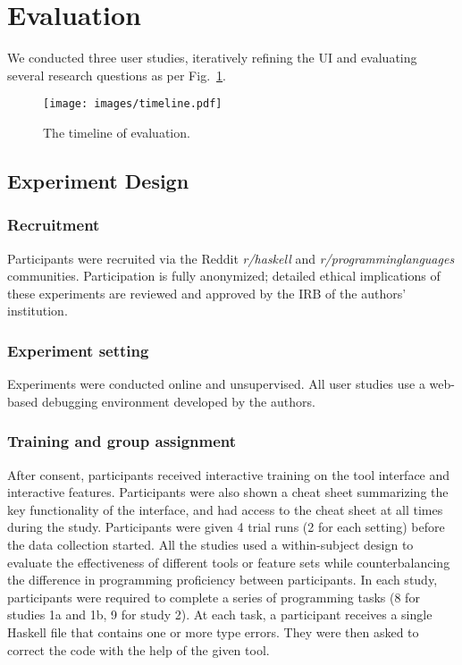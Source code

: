 \section{Evaluation}

We conducted three user studies, iteratively refining the \chameleon{} UI and evaluating several research questions as per Fig.~\ref{fig:timeline}. 



\begin{figure}
    \centering
    \texttt{[image: images/timeline.pdf]}
    \caption{The timeline of \chameleon{}  evaluation.}
    \label{fig:timeline}
\end{figure}

\subsection{Experiment Design}
\subsubsection*{\textbf{Recruitment}}

Participants were recruited via the Reddit \textit{r/haskell} and \textit{r/programminglanguages} communities. 
Participation is fully anonymized; detailed ethical implications of these experiments are reviewed and approved by the IRB of the authors' institution.


\subsubsection*{\textbf{Experiment setting}}
Experiments were conducted online and unsupervised. 
All user studies use a web-based debugging environment developed by the authors. 


\subsubsection*{\textbf{Training and group assignment}}
After consent, participants received interactive training on the tool interface and interactive features. Participants were also shown a cheat sheet summarizing the key functionality of the interface, and had access to the cheat sheet at all times during the study. Participants were given 4 trial runs (2 for each setting) before the data collection started. 
All the studies used a within-subject design to evaluate the effectiveness of different tools or feature sets while counterbalancing the difference in programming proficiency between participants. In each study, participants were required to complete a series of programming tasks (8 for studies 1a and 1b, 9 for study 2). At each task, a participant receives a single Haskell file that contains one or more type errors. They were then asked to correct the code with the help of the given tool.


